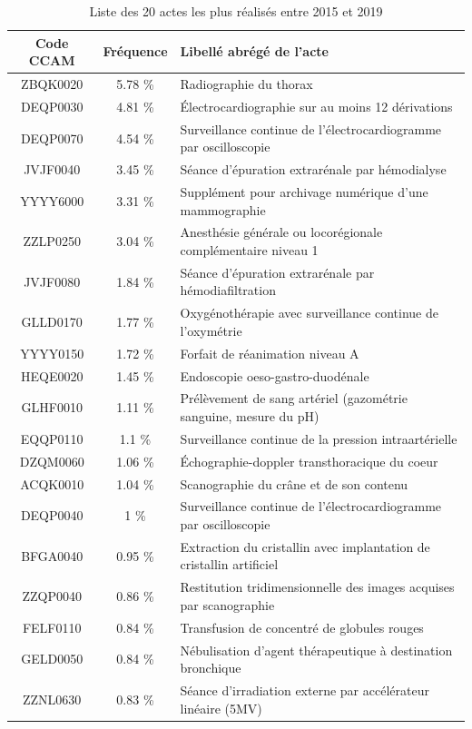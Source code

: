 \begin{table}[!ht]
\centering
\caption{Liste des 20 actes les plus réalisés entre 2015 et 2019} 
\begin{tabular}{c|cl}
  \hline
Code CCAM & Fréquence & Libellé abrégé de l'acte \\ 
  \hline
ZBQK0020 & 5.78 \% & Radiographie du thorax \\ 
  DEQP0030 & 4.81 \% & Électrocardiographie sur au moins 12 dérivations \\ 
  DEQP0070 & 4.54 \% & Surveillance continue de l'électrocardiogramme par oscilloscopie\\ 
  JVJF0040 & 3.45 \% & Séance d'épuration extrarénale par hémodialyse \\ 
  YYYY6000 & 3.31 \% & Supplément pour archivage numérique d'une mammographie \\ 
  ZZLP0250 & 3.04 \% & Anesthésie générale ou locorégionale complémentaire niveau 1 \\ 
  JVJF0080 & 1.84 \% & Séance d'épuration extrarénale par hémodiafiltration\\ 
  GLLD0170 & 1.77 \% & Oxygénothérapie avec surveillance continue de l'oxymétrie \\ 
  YYYY0150 & 1.72 \% & Forfait de réanimation niveau A \\ 
  HEQE0020 & 1.45 \% & Endoscopie oeso-gastro-duodénale \\ 
  GLHF0010 & 1.11 \% & Prélèvement de sang artériel (gazométrie sanguine, mesure du pH) \\ 
  EQQP0110 & 1.1 \% & Surveillance continue de la pression intraartérielle \\ 
  DZQM0060 & 1.06 \% & Échographie-doppler transthoracique du coeur \\ 
  ACQK0010 & 1.04 \% & Scanographie du crâne et de son contenu \\ 
  DEQP0040 & 1 \% & Surveillance continue de l'électrocardiogramme par oscilloscopie \\ 
  BFGA0040 & 0.95 \% & Extraction du cristallin avec implantation de cristallin artificiel \\ 
  ZZQP0040 & 0.86 \% & Restitution tridimensionnelle des images acquises par scanographie \\ 
  FELF0110 & 0.84 \% & Transfusion de concentré de globules rouges \\ 
  GELD0050 & 0.84 \% & Nébulisation d'agent thérapeutique à destination bronchique \\ 
  ZZNL0630 & 0.83 \% & Séance d'irradiation externe par accélérateur linéaire  (5MV) \\ 
   \hline
\end{tabular}
\end{table}



